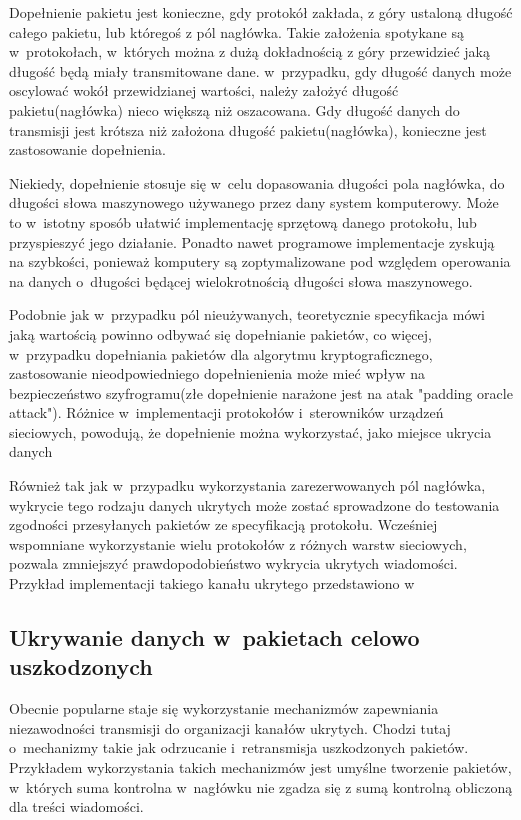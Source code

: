 \documentclass[a4paper, twoside, 12pt]{report}
\begin{document}
        Dopełnienie pakietu jest konieczne, gdy protokół zakłada, z góry ustaloną długość
        całego pakietu, lub któregoś z pól nagłówka. Takie założenia spotykane są
        w~protokołach, w~których można z dużą dokładnością z góry przewidzieć jaką długość
        będą miały transmitowane dane. w~przypadku, gdy długość danych może oscylować
        wokół przewidzianej wartości, należy założyć długość pakietu(nagłówka)
        nieco większą niż oszacowana. Gdy długość danych do transmisji jest krótsza niż
        założona długość pakietu(nagłówka), konieczne jest zastosowanie dopełnienia.

        Niekiedy, dopełnienie stosuje się w~celu dopasowania długości pola nagłówka,
        do długości słowa maszynowego używanego przez dany system komputerowy. Może
        to w~istotny sposób ułatwić implementację sprzętową danego protokołu, lub
        przyspieszyć jego działanie. Ponadto nawet programowe implementacje zyskują
        na szybkości, ponieważ komputery są zoptymalizowane pod względem operowania
        na danych o~długości będącej wielokrotnością długości słowa maszynowego.

        Podobnie jak w~przypadku pól nieużywanych, teoretycznie specyfikacja
        mówi jaką wartością powinno odbywać się dopełnianie pakietów, co więcej,
        w~przypadku dopełniania pakietów dla algorytmu kryptograficznego, zastosowanie
        nieodpowiedniego dopełnienienia może mieć wpływ na bezpieczeństwo szyfrogramu(złe dopełnienie narażone
        jest na atak "padding oracle attack"). Różnice w~implementacji protokołów
        i~sterowników urządzeń sieciowych, powodują, że dopełnienie można wykorzystać,
        jako miejsce ukrycia danych\cite{PADSTEG}

        Również tak jak w~przypadku wykorzystania zarezerwowanych pól nagłówka,
        wykrycie tego rodzaju danych ukrytych może zostać sprowadzone do testowania
        zgodności przesyłanych pakietów ze specyfikacją protokołu. Wcześniej wspomniane
        wykorzystanie wielu protokołów z różnych warstw sieciowych, pozwala zmniejszyć
        prawdopodobieństwo wykrycia ukrytych wiadomości. Przykład implementacji
        takiego kanału ukrytego przedstawiono w~\cite{PADSTEG}

        \subsection{Ukrywanie danych w~pakietach celowo uszkodzonych} \label{USZKODZONEPAKIETY}
        Obecnie popularne staje się wykorzystanie mechanizmów zapewniania niezawodności
        transmisji do organizacji kanałów ukrytych. Chodzi tutaj o~mechanizmy
        takie jak odrzucanie i~retransmisja uszkodzonych pakietów. Przykładem wykorzystania takich
        mechanizmów jest umyślne tworzenie pakietów, w~których suma kontrolna w~nagłówku
        nie zgadza się z sumą kontrolną obliczoną dla treści wiadomości.
\end{document}

